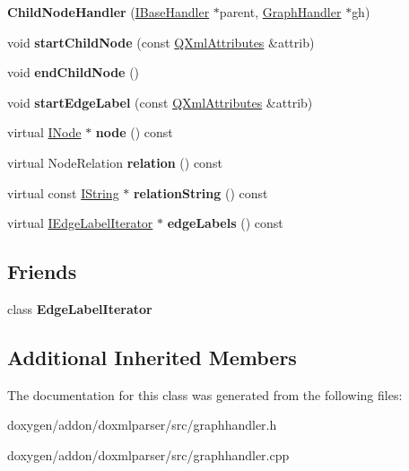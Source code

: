 \begin{DoxyCompactItemize}
\item 
\mbox{\label{class_child_node_handler_ab09cef5eb1b68692b52e79c80026596f}} 
{\bfseries Child\+Node\+Handler} (\mbox{\hyperlink{class_i_base_handler}{I\+Base\+Handler}} $\ast$parent, \mbox{\hyperlink{class_graph_handler}{Graph\+Handler}} $\ast$gh)
\item 
\mbox{\label{class_child_node_handler_a37c31310f83099c2e499571dedd84bc8}} 
void {\bfseries start\+Child\+Node} (const \mbox{\hyperlink{class_q_xml_attributes}{Q\+Xml\+Attributes}} \&attrib)
\item 
\mbox{\label{class_child_node_handler_a4ff67af9ddcfe64aeceb34ded13f7752}} 
void {\bfseries end\+Child\+Node} ()
\item 
\mbox{\label{class_child_node_handler_ae6f1e090610d905f6ddd751fdb4f3605}} 
void {\bfseries start\+Edge\+Label} (const \mbox{\hyperlink{class_q_xml_attributes}{Q\+Xml\+Attributes}} \&attrib)
\item 
\mbox{\label{class_child_node_handler_a32e794c291c564231f6fddd22f747ab3}} 
virtual \mbox{\hyperlink{class_i_node}{I\+Node}} $\ast$ {\bfseries node} () const
\item 
\mbox{\label{class_child_node_handler_a89f65cbd3554adcb3e183fd8d0fed523}} 
virtual Node\+Relation {\bfseries relation} () const
\item 
\mbox{\label{class_child_node_handler_a00ee85d776fab0ddd9320555fd6f13c9}} 
virtual const \mbox{\hyperlink{class_i_string}{I\+String}} $\ast$ {\bfseries relation\+String} () const
\item 
\mbox{\label{class_child_node_handler_aaf9dd9716e47a1dd7c2c4953b64525f8}} 
virtual \mbox{\hyperlink{class_i_edge_label_iterator}{I\+Edge\+Label\+Iterator}} $\ast$ {\bfseries edge\+Labels} () const
\end{DoxyCompactItemize}
\subsection*{Friends}
\begin{DoxyCompactItemize}
\item 
\mbox{\label{class_child_node_handler_af04914e6743dfa65bd97548d5db241fc}} 
class {\bfseries Edge\+Label\+Iterator}
\end{DoxyCompactItemize}
\subsection*{Additional Inherited Members}


The documentation for this class was generated from the following files\+:\begin{DoxyCompactItemize}
\item 
doxygen/addon/doxmlparser/src/graphhandler.\+h\item 
doxygen/addon/doxmlparser/src/graphhandler.\+cpp\end{DoxyCompactItemize}

